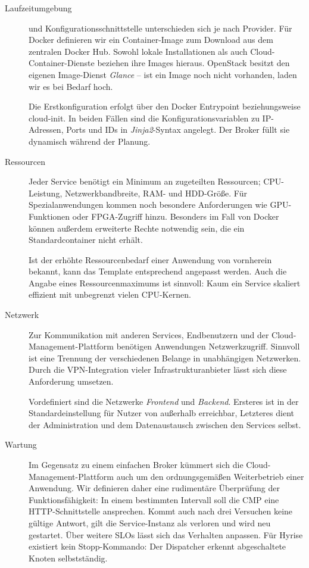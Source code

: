 \begin{description}
	\item[Laufzeitumgebung] und Konfigurationsschnittstelle unterschieden sich je nach Provider. Für Docker definieren wir ein Container-Image zum Download aus dem zentralen Docker Hub. Sowohl lokale Installationen als auch Cloud-Container-Dienste beziehen ihre Images hieraus. OpenStack besitzt den eigenen Image-Dienst \emph{Glance} -- ist ein Image noch nicht vorhanden, laden wir es bei Bedarf hoch.
	
	Die Erstkonfiguration erfolgt über den Docker Entrypoint beziehungsweise cloud-init. In beiden Fällen sind die Konfigurationsvariablen zu IP-Adressen, Ports und IDs in \emph{Jinja2}-Syntax angelegt. Der Broker füllt sie dynamisch während der Planung.
	
	\item[Ressourcen] Jeder Service benötigt ein Minimum an zugeteilten Ressourcen; CPU-Leistung, Netzwerkbandbreite, RAM- und HDD-Größe. Für Spezialanwendungen kommen noch besondere Anforderungen wie GPU-Funktionen oder FPGA-Zugriff hinzu. Besonders im Fall von Docker können außerdem erweiterte Rechte notwendig sein, die ein Standardcontainer nicht erhält. 
	
	Ist der erhöhte Ressourcenbedarf einer Anwendung von vornherein bekannt, kann das Template entsprechend angepasst werden. Auch die Angabe eines Ressourcenmaximums ist sinnvoll: Kaum ein Service skaliert effizient mit unbegrenzt vielen CPU-Kernen.
	
	\item[Netzwerk] Zur Kommunikation mit anderen Services, Endbenutzern und der Cloud-Management-Plattform benötigen Anwendungen Netzwerkzugriff. Sinnvoll ist eine Trennung der verschiedenen Belange in unabhängigen Netzwerken. Durch die VPN-Integration vieler Infrastrukturanbieter lässt sich diese Anforderung umsetzen. 
	
	Vordefiniert sind die Netzwerke \emph{Frontend} und \emph{Backend}. Ersteres ist in der Standardeinstellung für Nutzer von außerhalb erreichbar, Letzteres dient der Administration und dem Datenaustausch zwischen den Services selbst.
		
	\item[Wartung] Im Gegensatz zu einem einfachen Broker kümmert sich die Cloud-Management-Plattform auch um den ordnungsgemäßen Weiterbetrieb einer Anwendung. Wir definieren daher eine rudimentäre Überprüfung der Funktionsfähigkeit: In einem bestimmten Intervall soll die CMP eine HTTP-Schnittstelle ansprechen. Kommt auch nach drei Versuchen keine gültige Antwort, gilt die Service-Instanz als verloren und wird neu gestartet. Über weitere SLOs lässt sich das Verhalten anpassen. Für Hyrise existiert kein Stopp-Kommando: Der Dispatcher erkennt abgeschaltete Knoten selbstständig.
	
\end{description}


